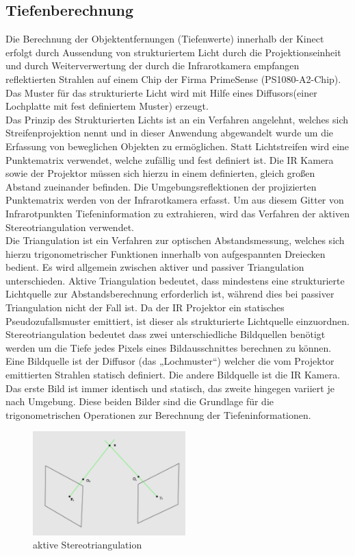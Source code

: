 \subsection{Tiefenberechnung}
Die Berechnung der Objektentfernungen (Tiefenwerte) innerhalb der Kinect erfolgt durch Aussendung von strukturiertem Licht durch die Projektionseinheit und durch Weiterverwertung  der durch die Infrarotkamera empfangen reflektierten Strahlen auf einem Chip der Firma PrimeSense (PS1080-A2-Chip). Das Muster für das strukturierte Licht wird mit Hilfe eines Diffusors(einer Lochplatte mit fest definiertem Muster) erzeugt.\\
Das Prinzip des Strukturierten Lichts ist an ein Verfahren angelehnt, welches sich Streifenprojektion nennt und in dieser Anwendung abgewandelt wurde um die Erfassung von beweglichen Objekten zu ermöglichen. Statt Lichtstreifen wird eine Punktematrix verwendet, welche zufällig und fest definiert ist. Die IR Kamera sowie der Projektor müssen sich hierzu in einem definierten, gleich großen Abstand zueinander befinden.
Die Umgebungsreflektionen der projizierten Punktematrix werden von der Infrarotkamera erfasst.
Um aus diesem Gitter von Infrarotpunkten Tiefeninformation zu extrahieren, wird das Verfahren der aktiven Stereotriangulation verwendet.\\
Die Triangulation ist ein Verfahren zur optischen Abstandsmessung, welches sich hierzu trigonometrischer Funktionen innerhalb von aufgespannten Dreiecken bedient. 
Es wird allgemein zwischen aktiver und passiver Triangulation unterschieden.
Aktive Triangulation bedeutet, dass mindestens eine strukturierte Lichtquelle zur Abstandsberechnung erforderlich ist, während dies bei passiver Triangulation nicht der Fall ist.
Da der IR Projektor ein statisches Pseudozufallsmuster emittiert, ist dieser als strukturierte Lichtquelle einzuordnen.
Stereotriangulation bedeutet dass zwei unterschiedliche Bildquellen benötigt werden um die Tiefe jedes Pixels eines Bildausschnittes berechnen zu können.
Eine Bildquelle ist der Diffusor (das „Lochmuster“) welcher die vom Projektor emittierten Strahlen statisch definiert. Die andere Bildquelle ist die IR Kamera.
Das erste Bild ist immer identisch und statisch, das zweite hingegen variiert je nach Umgebung. Diese beiden Bilder sind die Grundlage für die trigonometrischen Operationen zur Berechnung der Tiefeninformationen.
\begin{figure}
  \vspace{-20pt}
  \begin{center}
        \includegraphics[height=4cm]{Res/Triangulation.png}
  \end{center}
  \vspace{-20pt}
  \caption{aktive Stereotriangulation }
  \vspace{-10pt}
\end{figure}

